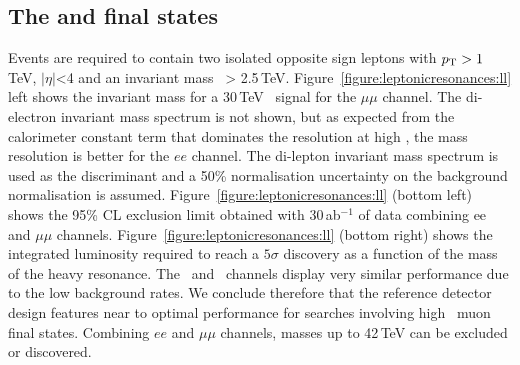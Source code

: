 \subsection{The \texorpdfstring{\ee}{ee} and \texorpdfstring{\mumu}{mumu} final states}
\label{sec:lepee}

Events are required to contain two isolated opposite sign leptons with $p_{\text{T}} > 1$\,TeV, $|\eta|$<4 and an invariant mass \mll\ > 2.5\,TeV.
Figure~\ref{figure:leptonicresonances:ll} left shows the invariant mass for a 30\,TeV \ZpSSM\ signal for the $\mu\mu$ channel. The di-electron invariant mass spectrum is not shown, but as expected from the calorimeter constant term that dominates the resolution at high \pt, the mass resolution is better for the $ee$ channel.
The di-lepton invariant mass spectrum is used as the discriminant and a 50\% normalisation uncertainty on the background normalisation is assumed.
Figure~\ref{figure:leptonicresonances:ll} (bottom left) shows the 95\% CL exclusion limit obtained with 30\,ab$^{-1}$ of data combining ee and $\mu\mu$ channels. Figure~\ref{figure:leptonicresonances:ll} (bottom right) shows the integrated luminosity required to reach a $5\sigma$ discovery as a function of the mass of the heavy resonance. The \Zpee\ and \Zpmumu\ channels display very similar performance due to the low background rates. We conclude therefore that the reference detector design features near to optimal performance for searches involving high \pt\ muon final states. Combining $ee$ and $\mu\mu$ channels, masses up to 42\,TeV can be excluded or discovered.

